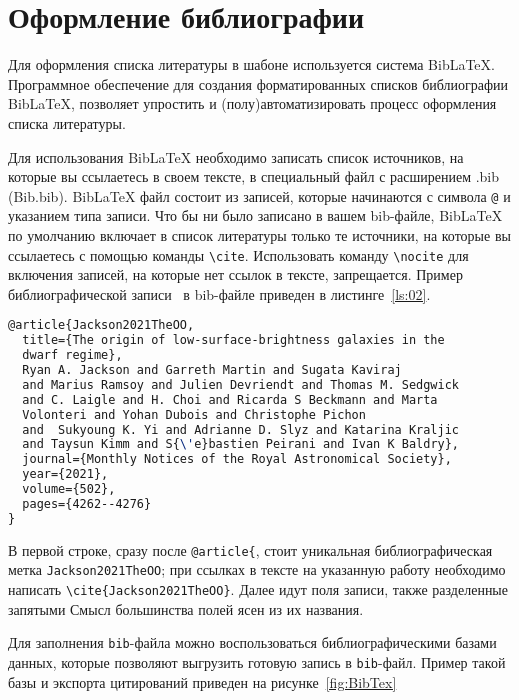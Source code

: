 \chapter{Оформление библиографии}\label{Bib_chapter}

Для оформления списка литературы в шабоне используется система Bib\LaTeX.
Программное обеспечение для создания форматированных списков библиографии
Bib\LaTeX, позволяет упростить и (полу)автоматизировать процесс оформления
списка литературы. 

Для использования Bib\LaTeX{} необходимо записать список источников, на которые
вы ссылаетесь в своем тексте, в специальный файл с расширением .bib (Bib.bib).
Bib\LaTeX{} файл состоит из записей, которые начинаются с символа \verb|@| и
указанием типа записи. Что бы ни было записано в вашем bib-файле,
Bib\LaTeX{} по умолчанию включает в список литературы только те источники, на
которые вы ссылаетесь с помощью команды \verb|\cite|. Использовать команду
\verb|\nocite| для включения записей, на которые нет ссылок в тексте,
запрещается. Пример библиографической записи~\cite{Jackson2021TheOO}
в bib-файле приведен в листинге~\ref{ls:02}.

\begin{lstlisting}[caption={Пример библиографической записи}, label={ls:02}, language=TeX]
@article{Jackson2021TheOO,
  title={The origin of low-surface-brightness galaxies in the 
  dwarf regime},
  Ryan A. Jackson and Garreth Martin and Sugata Kaviraj 
  and Marius Ramsoy and Julien Devriendt and Thomas M. Sedgwick 
  and C. Laigle and H. Choi and Ricarda S Beckmann and Marta 
  Volonteri and Yohan Dubois and Christophe Pichon 
  and  Sukyoung K. Yi and Adrianne D. Slyz and Katarina Kraljic 
  and Taysun Kimm and S{\'e}bastien Peirani and Ivan K Baldry},
  journal={Monthly Notices of the Royal Astronomical Society},
  year={2021},
  volume={502},
  pages={4262--4276}
}
\end{lstlisting}

В первой строке, сразу после \verb|@article{|, стоит уникальная библиографическая
метка \verb|Jackson2021TheOO|; при ссылках в тексте на указанную работу
необходимо написать  \verb|\cite{Jackson2021TheOO}|. Далее идут поля записи,
также разделенные запятыми  Смысл большинства полей ясен из их названия. 

Для заполнения \verb|bib|-файла можно воспользоваться библиографическими базами
данных, которые позволяют выгрузить готовую запись в \verb|bib|-файл. Пример
такой базы и экспорта цитирований приведен на рисунке~\ref{fig:BibTex} 

